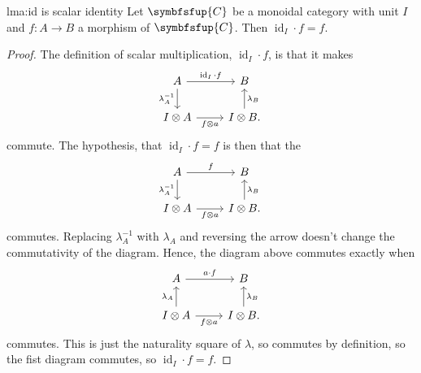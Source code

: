 \documentclass[fleqn]{NotesClass}
\newcommand{\cat}[1]{\symbfsfup{#1}}
\DeclareMathOperator{\id}{id}
\begin{document}
    \begin{lma}{}{lma:id is scalar identity}
        Let \(\cat{C}\) be a monoidal category with unit \(I\) and \(f \colon A \to B\) a morphism of \(\cat{C}\).
        Then \(\id_I \cdot f = f\).
        \begin{proof}
            The definition of scalar multiplication, \(\id_I \cdot f\), is that it makes
            \begin{equation}
                \begin{tikzcd}
                    A \arrow[r, "\id_I \cdot f"] \arrow[d, "\lambda_A^{-1}"'] & B\\
                    I \otimes A \arrow[r, "f \otimes a"'] & I \otimes B. \arrow[u, "\lambda_B"']
                \end{tikzcd}
            \end{equation}
            commute.
            The hypothesis, that \(\id_I \cdot f = f\) is then that the 
            \begin{equation}
                \begin{tikzcd}
                    A \arrow[r, "f"] \arrow[d, "\lambda_A^{-1}"'] & B\\
                    I \otimes A \arrow[r, "f \otimes a"'] & I \otimes B. \arrow[u, "\lambda_B"']
                \end{tikzcd}
            \end{equation}
            commutes.
            Replacing \(\lambda_A^{-1}\) with \(\lambda_A\) and reversing the arrow doesn't change the commutativity of the diagram.
            Hence, the diagram above commutes exactly when
            \begin{equation}
                \begin{tikzcd}
                    A \arrow[r, "a \cdot f"] & B\\
                    I \otimes A \arrow[u, "\lambda_A"] \arrow[r, "f \otimes a"'] & I \otimes B. \arrow[u, "\lambda_B"']
                \end{tikzcd}
            \end{equation}
            commutes.
            This is just the naturality square of \(\lambda\), so commutes by definition, so the fist diagram commutes, so \(\id_I \cdot f = f\).
        \end{proof}
    \end{lma}
    
\end{document}
